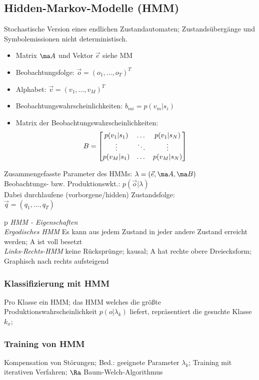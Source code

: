\documentclass[german,color,6pt]{latex4ei/latex4ei_sheet}
\begin{document}
\begin{sectionbox}
	\subsection{Hidden-Markov-Modelle (HMM)}
	Stochastische Version eines endlichen Zustandautomaten; Zustandsübergänge und Symbolemissionen nicht deterministisch.
	\begin{itemize}
		\item Matrix $\ma A$ und Vektor $\vec e$ siehe MM
		\item Beobachtungsfolge: $\vec o = (o_1, \dots, o_T)^T$
		\item Alphabet: $\vec v = (v_1, \dots, v_M)^T$
		\item Beobachtungswahrscheinlichkeiten: $b_{mi}=p(v_m|s_i)$
		\item Matrix der Beobachtungswahrscheinlichkeiten: \\
		\begin{equation*}
			B = \begin{bmatrix}
				p(v_1 | s_1) & \dots & p(v_1 | s_N) \\
				\vdots & \ddots & \vdots \\
				p(v_M | s_1) & \dots & p(v_M | s_N) \\
		\end{bmatrix} \\
		\end{equation*}
	\end{itemize}
	Zusammengefasste Parameter des HMMs: $\lambda = (\vec e, \ma A, \ma B)$\\
	Beobachtungs- bzw. Produktionswkt.: $p(\vec o | \lambda )$ \\
	Dabei durchlaufene (vorborgene/hidden) Zustandsfolge: \\ $\vec q = (q_1, \dots, q_T)$

	\begin{tablebox}{p{\textwidth}}
	\emph{HMM - Eigenschaften} \\ %
	\cmrule
	\emph{Ergodisches HMM} \quad Es kann aus jedem Zustand in jeder andere Zustand erreicht werden; A ist voll besetzt \\
	\emph{Links-Rechts-HMM} \quad keine Rücksprünge; kausal; A hat rechte obere Dreiecksform; Graphisch nach rechts aufsteigend
	\end{tablebox}

	\subsubsection{Klassifizierung mit HMM}
	Pro Klasse ein HMM; das HMM welches die größte Produktionswahrscheinlichkeit $p(o|\lambda_k)$ liefert, repräsentiert die gesuchte Klasse $k_x$;

	\subsubsection{Training von HMM}
	Kompensation von Störungen; Bed.: geeignete Parameter $\lambda_k$; Training mit iterativen Verfahren; $\Ra$ Baum-Welch-Algorithmus
\end{sectionbox}
\end{document}
